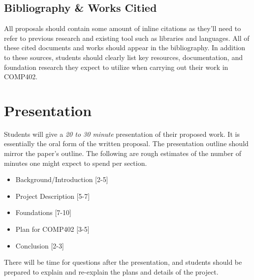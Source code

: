 \documentclass[10pt]{article}
\begin{document}
\subsection{Bibliography \& Works Citied}

All proposals should contain some amount of inline citations as they'll need to refer to previous research and existing tool such as libraries and languages. All of these cited documents and works should appear in the bibliography. In addition to these sources, students should clearly list key resources, documentation, and foundation research they expect to utilize when carrying out their work in COMP402.  

\section{Presentation}

Students will give a \textit{20 to 30 minute} presentation of their proposed work. It is essentially the oral form of the written proposal. The presentation outline should mirror the paper's outline. The following are rough estimates of the number of minutes one might expect to spend per section.
\begin{itemize}
\item Background/Introduction [2-5]
\item Project Description [5-7]
\item Foundations [7-10]
\item Plan for COMP402 [3-5]
\item Conclusion [2-3]
\end{itemize}
There will be time for questions after the presentation, and students should be prepared to explain and re-explain the plans and details of the project.  
\end{document}
